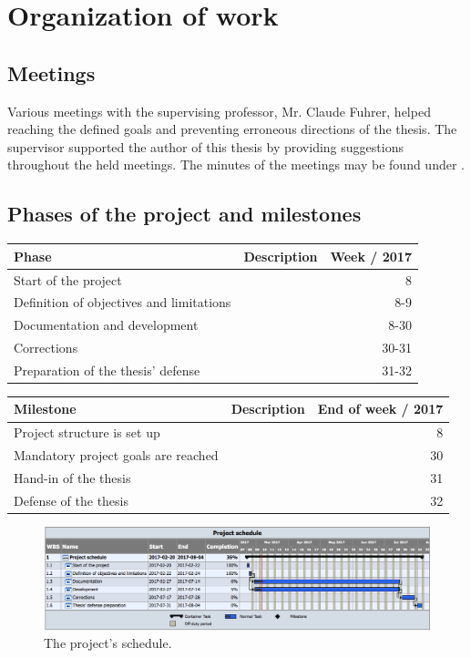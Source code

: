\documentclass[10pt, openright, notitlepage]{scrreprt}
\begin{document}
\section{Organization of work}
\label{sec:orga2b286b}
\subsection{Meetings}
\label{sec:org35efaa7}

Various meetings with the supervising professor, Mr. Claude Fuhrer, helped
reaching the defined goals and preventing erroneous directions of the thesis.
The supervisor supported the author of this thesis by providing suggestions
throughout the held meetings. The minutes of the meetings may be found under
\label{Meeting minutes}.

\subsection{Phases of the project and milestones}
\label{sec:org01154ea}


\begin{center}
\begin{tabular}{llr}
Phase & Description & Week / 2017\\
\hline
Start of the project &  & 8\\
Definition of objectives and limitations &  & 8-9\\
Documentation and development &  & 8-30\\
Corrections &  & 30-31\\
Preparation of the thesis' defense &  & 31-32\\
\end{tabular}
\end{center}

\begin{center}
\begin{tabular}{llr}
Milestone & Description & End of week / 2017\\
\hline
Project structure is set up &  & 8\\
Mandatory project goals are reached &  & 30\\
Hand-in of the thesis &  & 31\\
Defense of the thesis &  & 32\\
\end{tabular}
\end{center}

\begin{figure}[H]
\centering
\includegraphics[width=.9\linewidth]{./images/project_schedule.png}
\caption{\label{fig:schedule}
The project's schedule.}
\end{figure}
\end{document}
